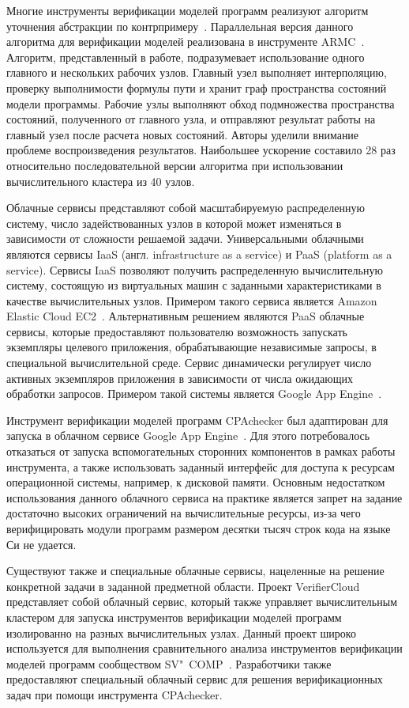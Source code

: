 Многие инструменты верификации моделей программ реализуют алгоритм уточнения абстракции по контрпримеру~\cite{Clarke:2003:CAR}.
Параллельная версия данного алгоритма для верификации моделей реализована в инструменте ARMC~\cite{Lopes2011}.
Алгоритм, представленный в работе, подразумевает использование одного главного и нескольких рабочих узлов.
Главный узел выполняет интерполяцию, проверку выполнимости формулы пути и хранит граф пространства состояний модели программы.
Рабочие узлы выполняют обход подмножества пространства состояний, полученного от главного узла, и отправляют результат работы на главный узел после расчета новых состояний.
Авторы уделили внимание проблеме воспроизведения результатов.
Наибольшее ускорение составило 28 раз относительно последовательной версии алгоритма при использовании вычислительного кластера из 40 узлов.

Облачные сервисы представляют собой масштабируемую распределенную систему, число задействованных узлов в которой может изменяться в зависимости от сложности решаемой задачи.
Универсальными облачными являются сервисы IaaS (англ. infrastructure as a service) и PaaS (platform as a service).
Сервисы IaaS позволяют получить распределенную вычислительную систему, состоящую из виртуальных машин с заданными характеристиками в качестве вычислительных узлов.
Примером такого сервиса является Amazon Elastic Cloud EC2~\cite{ec2}.
Альтернативным решением являются PaaS облачные сервисы, которые предоставляют пользователю возможность запускать экземпляры целевого приложения, обрабатывающие независимые запросы, в специальной вычислительной среде.
Сервис динамически регулирует число активных экземпляров приложения в зависимости от числа ожидающих обработки запросов.
Примером такой системы является Google App Engine~\cite{gae}.

Инструмент верификации моделей программ CPAchecker был адаптирован для запуска в облачном сервисе Google App Engine~\cite{Beyer:2014:SVG}. 
Для этого потребовалось отказаться от запуска вспомогательных сторонних компонентов в рамках работы инструмента, а также использовать заданный интерфейс для доступа к ресурсам операционной системы, например, к дисковой памяти.
Основным недостатком использования данного облачного сервиса на практике является запрет на задание достаточно высоких ограничений на вычислительные ресурсы, из-за чего верифицировать модули программ размером десятки тысяч строк кода на языке Си не удается.

Существуют также и специальные облачные сервисы, нацеленные на решение конкретной задачи в заданной предметной области.
Проект VerifierCloud~\cite{VerifierCloud} представляет собой облачный сервис, который также управляет вычислительным кластером для запуска инструментов верификации моделей программ изолированно на разных вычислительных узлах.
Данный проект широко используется для выполнения сравнительного анализа инструментов верификации моделей программ сообществом SV"~COMP~\cite{SVCOMP2014,Beyer2016}.
Разработчики также предоставляют специальный облачный сервис для решения верификационных задач при помощи инструмента CPAchecker.

